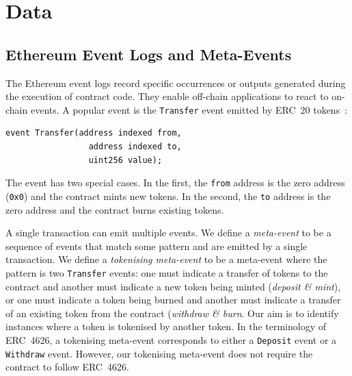 \section{Data}\label{sec:data}

\subsection{Ethereum Event Logs and Meta-Events}\label{sec:data-event-logs}

The Ethereum event logs record specific occurrences or outputs
generated during the execution of contract code.  They enable
off-chain applications to react to on-chain events.  A popular event
is the \texttt{Transfer} event emitted by ERC~20
tokens~\cite{vogelsteller-buterin-15}:

\begin{lstlisting}[language=Solidity,
    caption={The ERC~20 \texttt{Transfer} event specifies three
      parameters: \texttt{from}, \texttt{to}, and \texttt{value}.}]
  event Transfer(address indexed from,
                 address indexed to,
                 uint256 value);
\end{lstlisting}

The event has two special cases.  In the first, the \texttt{from}
address is the zero address (\texttt{0x0}) and the contract mints new
tokens.  In the second, the \texttt{to} address is the zero address
and the contract burns existing tokens.

A single transaction can emit multiple events.  We define a
\textit{meta-event} to be a sequence of events that match some pattern
and are emitted by a single transaction.  We define a
\textit{tokenising meta-event} to be a meta-event where the pattern is
two \texttt{Transfer} events: one must indicate a transfer of tokens
to the contract and another must indicate a new token being minted
(\textit{deposit \& mint}), or one must indicate a token being burned
and another must indicate a transfer of an existing token from the
contract (\textit{withdraw \& burn}.  Our aim is to identify instances
where a token is tokenised by another token.  In the terminology of
ERC~4626, a tokenising meta-event corresponds to either a
\texttt{Deposit} event or a \texttt{Withdraw} event.  However, our
tokenising meta-event does not require the contract to follow
ERC~4626.

